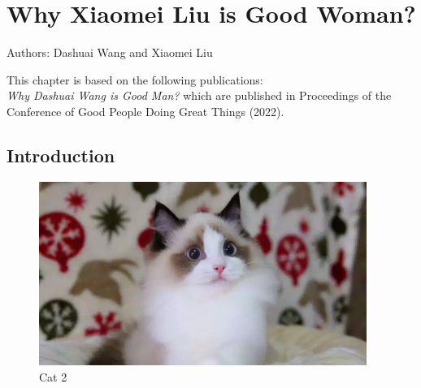 \chapter{Why Xiaomei Liu is Good Woman?}

\vspace*{\fill}
	\begin{center}
		Authors: Dashuai Wang and Xiaomei Liu
	\end{center}
\vspace*{\fill}


\vfill
\begin{center}
	This chapter is based on the following publications:\\ \textit{Why Dashuai Wang is Good Man?} \citep{wang_2022} which are published in Proceedings of the Conference of Good People Doing Great Things (2022).
\end{center}

\newpage

\section{Introduction}
\begin{figure}[h]
	\centering
	\includegraphics[width=0.95\textwidth]{chapter-2/images/fig3}
	\caption{Cat 2}
\end{figure}


\citep{wang_2022}